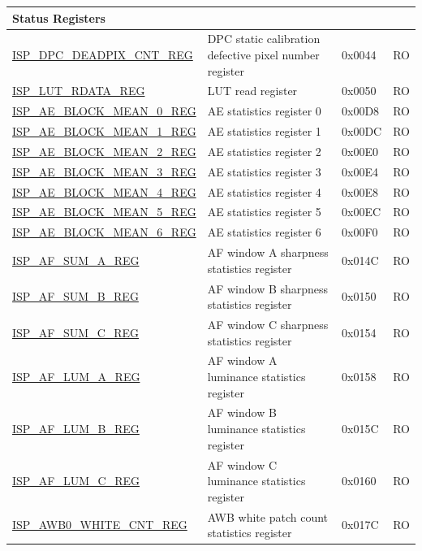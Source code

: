 \begin{longtable}{ | p{6cm} | p{7.2cm} | p{1.3cm} | p{1cm} | }
\multicolumn{4}{|l|}{\textbf{Status Registers}} \\ \hline
\hyperref[regdesc:ISPDPCDEADPIXCNTREG]{ISP\_DPC\_DEADPIX\_CNT\_REG} & DPC static calibration defective pixel number register & 0x0044 & RO \\ \hline
\hyperref[regdesc:ISPLUTRDATAREG]{ISP\_LUT\_RDATA\_REG} & LUT read register & 0x0050 & RO \\ \hline
\hyperref[regdesc:ISPAEBLOCKMEAN0REG]{ISP\_AE\_BLOCK\_MEAN\_0\_REG} & AE statistics register 0 & 0x00D8 & RO \\ \hline
\hyperref[regdesc:ISPAEBLOCKMEAN1REG]{ISP\_AE\_BLOCK\_MEAN\_1\_REG} & AE statistics register 1 & 0x00DC & RO \\ \hline
\hyperref[regdesc:ISPAEBLOCKMEAN2REG]{ISP\_AE\_BLOCK\_MEAN\_2\_REG} & AE statistics register 2 & 0x00E0 & RO \\ \hline
\hyperref[regdesc:ISPAEBLOCKMEAN3REG]{ISP\_AE\_BLOCK\_MEAN\_3\_REG} & AE statistics register 3 & 0x00E4 & RO \\ \hline
\hyperref[regdesc:ISPAEBLOCKMEAN4REG]{ISP\_AE\_BLOCK\_MEAN\_4\_REG} & AE statistics register 4 & 0x00E8 & RO \\ \hline
\hyperref[regdesc:ISPAEBLOCKMEAN5REG]{ISP\_AE\_BLOCK\_MEAN\_5\_REG} & AE statistics register 5 & 0x00EC & RO \\ \hline
\hyperref[regdesc:ISPAEBLOCKMEAN6REG]{ISP\_AE\_BLOCK\_MEAN\_6\_REG} & AE statistics register 6 & 0x00F0 & RO \\ \hline
\hyperref[regdesc:ISPAFSUMAREG]{ISP\_AF\_SUM\_A\_REG} & AF window A sharpness statistics register & 0x014C & RO \\ \hline
\hyperref[regdesc:ISPAFSUMBREG]{ISP\_AF\_SUM\_B\_REG} & AF window B sharpness statistics register & 0x0150 & RO \\ \hline
\hyperref[regdesc:ISPAFSUMCREG]{ISP\_AF\_SUM\_C\_REG} & AF window C sharpness statistics register & 0x0154 & RO \\ \hline
\hyperref[regdesc:ISPAFLUMAREG]{ISP\_AF\_LUM\_A\_REG} & AF window A luminance statistics register & 0x0158 & RO \\ \hline
\hyperref[regdesc:ISPAFLUMBREG]{ISP\_AF\_LUM\_B\_REG} & AF window B luminance statistics register & 0x015C & RO \\ \hline
\hyperref[regdesc:ISPAFLUMCREG]{ISP\_AF\_LUM\_C\_REG} & AF window C luminance statistics register & 0x0160 & RO \\ \hline
\hyperref[regdesc:ISPAWB0WHITECNTREG]{ISP\_AWB0\_WHITE\_CNT\_REG} & AWB white patch count statistics register & 0x017C & RO \\ \hline

\end{longtable}
